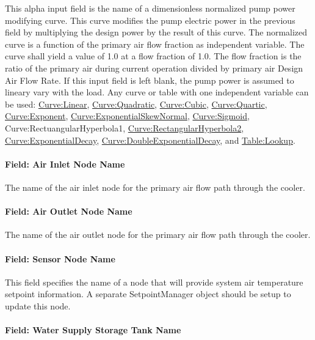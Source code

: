 This alpha input field is the name of a dimensionless normalized pump power modifying curve. This curve modifies the pump electric power in the previous field by multiplying the design power by the result of this curve. The normalized curve is a function of the primary air flow fraction as independent variable. The curve shall yield a value of 1.0 at a flow fraction of 1.0. The flow fraction is the ratio of the primary air during current operation divided by primary air Design Air Flow Rate. If this input field is left blank, the pump power is assumed to lineary vary with the load. Any curve or table with one independent variable can be used: \hyperref[curvelinear]{Curve:Linear}, \hyperref[curvequadratic]{Curve:Quadratic}, \hyperref[curvecubic]{Curve:Cubic}, \hyperref[curvequartic]{Curve:Quartic}, \hyperref[curveexponent]{Curve:Exponent}, \hyperref[curveexponentialskewnormal]{Curve:ExponentialSkewNormal}, \hyperref[curvesigmoid]{Curve:Sigmoid}, Curve:RectuangularHyperbola1, \hyperref[curverectangularhyperbola2]{Curve:RectangularHyperbola2}, \hyperref[curveexponentialdecay]{Curve:ExponentialDecay}, \hyperref[curvedoubleexponentialdecay]{Curve:DoubleExponentialDecay}, and \hyperref[tablelookup]{Table:Lookup}.

\paragraph{Field: Air Inlet Node Name}\label{field-air-inlet-node-name-1-001}

The name of the air inlet node for the primary air flow path through the cooler.

\paragraph{Field: Air Outlet Node Name}\label{field-air-outlet-node-name-1-000}

The name of the air outlet node for the primary air flow path through the cooler.

\paragraph{Field: Sensor Node Name}\label{field-sensor-node-name-001}

This field specifies the name of a node that will provide system air temperature setpoint information. A separate SetpointManager object should be setup to update this node.

\paragraph{Field: Water Supply Storage Tank Name}\label{field-water-supply-storage-tank-name-1}

